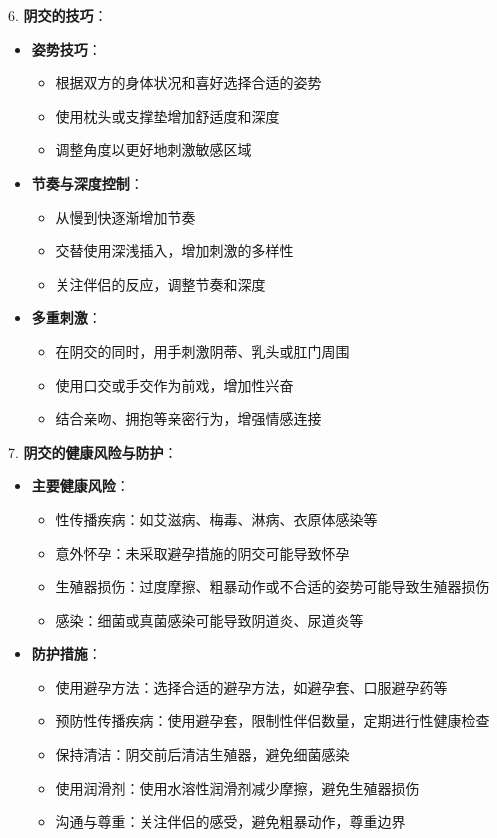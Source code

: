 \documentclass[12pt,UTF8]{ctexbook}
\begin{document}
6. \textbf{阴交的技巧}：
\begin{itemize}
	\item \textbf{姿势技巧}：
	\begin{itemize}
		\item 根据双方的身体状况和喜好选择合适的姿势
		\item 使用枕头或支撑垫增加舒适度和深度
		\item 调整角度以更好地刺激敏感区域
	\end{itemize}
	\item \textbf{节奏与深度控制}：
	\begin{itemize}
		\item 从慢到快逐渐增加节奏
		\item 交替使用深浅插入，增加刺激的多样性
		\item 关注伴侣的反应，调整节奏和深度
	\end{itemize}
	\item \textbf{多重刺激}：
	\begin{itemize}
		\item 在阴交的同时，用手刺激阴蒂、乳头或肛门周围
		\item 使用口交或手交作为前戏，增加性兴奋
		\item 结合亲吻、拥抱等亲密行为，增强情感连接
	\end{itemize}
\end{itemize}

7. \textbf{阴交的健康风险与防护}：
\begin{itemize}
	\item \textbf{主要健康风险}：
	\begin{itemize}
		\item 性传播疾病：如艾滋病、梅毒、淋病、衣原体感染等
		\item 意外怀孕：未采取避孕措施的阴交可能导致怀孕
		\item 生殖器损伤：过度摩擦、粗暴动作或不合适的姿势可能导致生殖器损伤
		\item 感染：细菌或真菌感染可能导致阴道炎、尿道炎等
	\end{itemize}
	\item \textbf{防护措施}：
	\begin{itemize}
		\item 使用避孕方法：选择合适的避孕方法，如避孕套、口服避孕药等
		\item 预防性传播疾病：使用避孕套，限制性伴侣数量，定期进行性健康检查
		\item 保持清洁：阴交前后清洁生殖器，避免细菌感染
		\item 使用润滑剂：使用水溶性润滑剂减少摩擦，避免生殖器损伤
		\item 沟通与尊重：关注伴侣的感受，避免粗暴动作，尊重边界
	\end{itemize}
\end{itemize}
\end{document}
